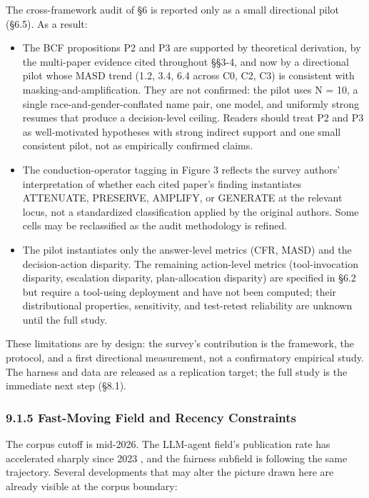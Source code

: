 \documentclass[10pt]{article}
\begin{document}
The cross-framework audit of \S{}6 is reported only as a small directional pilot (\S{}6.5). As a result:

\begin{itemize}
\item The BCF propositions P2 and P3 are supported by theoretical derivation, by the multi-paper evidence cited throughout \S{}\S{}3-4, and now by a directional pilot whose MASD trend (1.2, 3.4, 6.4 across C0, C2, C3) is consistent with masking-and-amplification. They are not confirmed: the pilot uses N = 10, a single race-and-gender-conflated name pair, one model, and uniformly strong resumes that produce a decision-level ceiling. Readers should treat P2 and P3 as well-motivated hypotheses with strong indirect support and one small consistent pilot, not as empirically confirmed claims.
\item The conduction-operator tagging in Figure 3 reflects the survey authors' interpretation of whether each cited paper's finding instantiates ATTENUATE, PRESERVE, AMPLIFY, or GENERATE at the relevant locus, not a standardized classification applied by the original authors. Some cells may be reclassified as the audit methodology is refined.
\item The pilot instantiates only the answer-level metrics (CFR, MASD) and the decision-action disparity. The remaining action-level metrics (tool-invocation disparity, escalation disparity, plan-allocation disparity) are specified in \S{}6.2 but require a tool-using deployment and have not been computed; their distributional properties, sensitivity, and test-retest reliability are unknown until the full study.
\end{itemize}

These limitations are by design: the survey's contribution is the framework, the protocol, and a first directional measurement, not a confirmatory empirical study. The harness and data are released as a replication target; the full study is the immediate next step (\S{}8.1).

\subsubsection*{9.1.5 Fast-Moving Field and Recency Constraints}

The corpus cutoff is mid-2026. The LLM-agent field's publication rate has accelerated sharply since 2023 \cite{wang2024survey}, and the fairness subfield is following the same trajectory. Several developments that may alter the picture drawn here are already visible at the corpus boundary:
\end{document}

